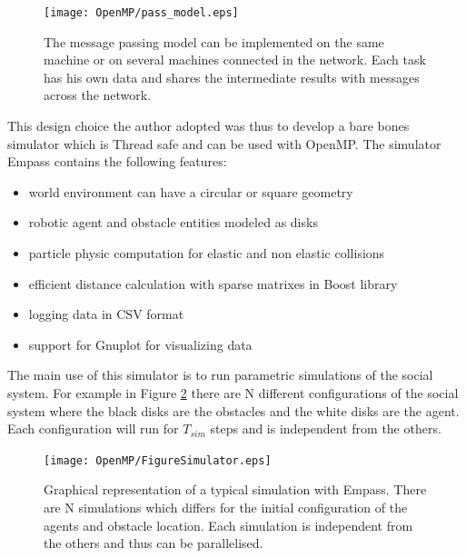 \begin{figure}[htbp]
\begin{center}
\texttt{[image: OpenMP/pass\_model.eps]}
\end{center}
\small{
\caption[The message passing model]{
The message passing model can be implemented on the same machine or on several
machines connected in the network. Each task has his own data and shares the
intermediate results with messages across the network.
\label{Fig:Parallel:passModel}}}
\end{figure}

This design choice the author adopted was thus to develop a bare bones simulator
which is Thread safe and can be used with OpenMP.
The simulator Empass contains the following features:
\begin{itemize}
 \item world environment can have a circular or square geometry
 \item robotic agent and obstacle entities modeled as disks
 \item particle physic computation for elastic and non elastic collisions
 \item efficient distance calculation with sparse matrixes in Boost library
 \item logging data in CSV format
 \item support for Gnuplot for visualizing data
\end{itemize}
The main use of this simulator is to run parametric simulations
of the social system. For example in Figure \ref{Fig:Parallel:Empass}
there are N different configurations of the social system where
the black disks are the obstacles and the white disks are the agent.
Each configuration will run for $T_{sim}$ steps and is independent
from the others.

\begin{figure}[htbp]
\begin{center}
\texttt{[image: OpenMP/FigureSimulator.eps]}
\end{center}
\small{
\caption[Empass simulator]{
Graphical representation of a typical simulation with Empass.
There are N simulations which differs for the initial configuration of
the agents and obstacle location. Each simulation is independent from
the others and thus can be parallelised.
\label{Fig:Parallel:Empass}}}
\end{figure}

